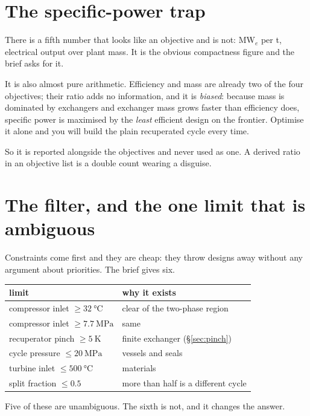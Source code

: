 \documentclass[11pt,a4paper]{report}
\begin{document}
\section{The specific-power trap}

There is a fifth number that looks like an objective and is not:
\si{\mega\watt}$_e$ per \si{\tonne}, electrical output over plant mass. It is
the obvious compactness figure and the brief asks for it.

It is also almost pure arithmetic. Efficiency and mass are already two of the
four objectives; their ratio adds no information, and it is \emph{biased}:
because mass is dominated by exchangers and exchanger mass grows faster than
efficiency does, specific power is maximised by the \emph{least} efficient
design on the frontier. Optimise it alone and you will build the plain
recuperated cycle every time.

So it is reported alongside the objectives and never used as one. A derived
ratio in an objective list is a double count wearing a disguise.

\section{The filter, and the one limit that is ambiguous}

Constraints come first and they are cheap: they throw designs away without
any argument about priorities. The brief gives six.

\begin{center}
\begin{tabular}{ll}
\toprule
limit & why it exists \\
\midrule
compressor inlet $\ge \SI{32}{\celsius}$ & clear of the two-phase region \\
compressor inlet $\ge \SI{7.7}{\mega\pascal}$ & same \\
recuperator pinch $\ge \SI{5}{\kelvin}$ & finite exchanger
(\S\ref{sec:pinch}) \\
cycle pressure $\le \SI{20}{\mega\pascal}$ & vessels and seals \\
turbine inlet $\le \SI{500}{\celsius}$ & materials \\
split fraction $\le 0.5$ & more than half is a different cycle \\
\bottomrule
\end{tabular}
\end{center}

Five of these are unambiguous. The sixth is not, and it changes the answer.
\end{document}

